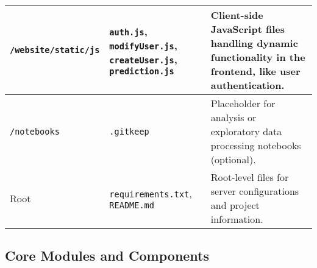 \documentclass[conference]{IEEEtran}
\begin{document}
\begin{table}[H]
{\begin{tabular}{|l|p{3cm}|p{7cm}|}
        \texttt{/website/static/js} & \texttt{auth.js}, \texttt{modifyUser.js}, \texttt{createUser.js}, \texttt{prediction.js} & Client-side \newline JavaScript files \newline handling dynamic \newline functionality in the \newline frontend, like user \newline authentication. \\ \hline
        \texttt{/notebooks} & \texttt{.gitkeep} & Placeholder for \newline analysis or \newline exploratory data \newline processing \newline notebooks (optional). \\ \hline
        Root & \texttt{requirements.txt}, \texttt{README.md} & Root-level files for \newline server configurations \newline and project \newline information. \\ \hline
    \end{tabular}
    }
\end{table}
\clearpage
\subsection{Core Modules and Components}
\end{document}
